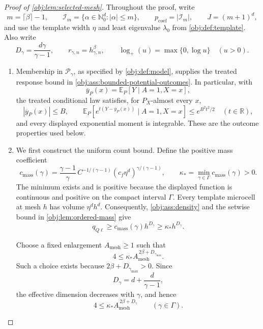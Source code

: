 \documentclass[11pt]{article}
\begin{document}
\begin{proof}[Proof of \cref{obj:lem:selected-mesh}]
Throughout the proof, write
\[
m=\lceil\beta\rceil-1,\qquad
\mathcal I_m=\{\alpha\in\mathbb N_0^d:|\alpha|\le m\},
\qquad
p_{\mathrm{coef}}=|\mathcal I_m|,
\qquad
J=(m+1)^d,
\]
and use the template width \(\eta\) and least eigenvalue \(\lambda_0\) from
\cref{obj:def:template}. Also write
\[
D_\gamma=\frac{d\gamma}{\gamma-1},
\qquad
r_{\gamma,n}=h_{\gamma,n}^{\beta},
\qquad
\log_+(u)=\max\{0,\log u\}\quad(u>0).
\]

\begin{enumerate}
\item Membership in \(\mathcal P_\gamma\), as specified by
\cref{obj:def:model}, supplies the treated response bound in
\cref{obj:ass:bounded-potential-outcomes}. In particular, with
\[
\overline y_P(x)=\mathbb E_P[Y\mid A=1,X=x],
\]
the treated conditional law satisfies, for \(P_X\)-almost every \(x\),
\[
|\overline y_P(x)|\le B,\qquad
\mathbb E_P\!\left[
 e^{t(Y-\overline y_P(x))}\mid A=1,X=x
\right]\le e^{B^2t^2/2}
\quad(t\in\mathbb R),
\]
and every displayed exponential moment is integrable. These are the
outcome properties used below.

\item We first construct the uniform count bound. Define the positive mass
coefficient
\[
c_{\mathrm{mass}}(\gamma)
=
\frac{\gamma-1}{\gamma}\,
C^{-1/(\gamma-1)}
(c_f\eta^d)^{\gamma/(\gamma-1)},
\qquad
\kappa_*=\min_{\gamma\in\Gamma}c_{\mathrm{mass}}(\gamma)>0.
\]
The minimum exists and is positive because the displayed function is
continuous and positive on the compact interval \(\Gamma\).
Every template microcell at mesh \(h\) has volume \(\eta^dh^d\).
Consequently, \cref{obj:ass:density} and the setwise bound in
\cref{obj:lem:ordered-mass} give
\[
q_{Q\ell}\ge c_{\mathrm{mass}}(\gamma)h^{D_\gamma}
\ge\kappa_*h^{D_\gamma}.
\]

Choose a fixed enlargement \(A_{\mathrm{mesh}}\ge1\) such that
\[
4\le
\kappa_*A_{\mathrm{mesh}}^{\,2\beta+D_{\gamma_{\max}}}.
\]
Such a choice exists because \(2\beta+D_{\gamma_{\max}}>0\).
Since
\[
D_\gamma=d+\frac d{\gamma-1},
\]
the effective dimension decreases with \(\gamma\), and hence
\[
4\le
\kappa_*A_{\mathrm{mesh}}^{\,2\beta+D_\gamma}
\qquad(\gamma\in\Gamma).
\]


\end{enumerate}
\end{proof}
\end{document}
